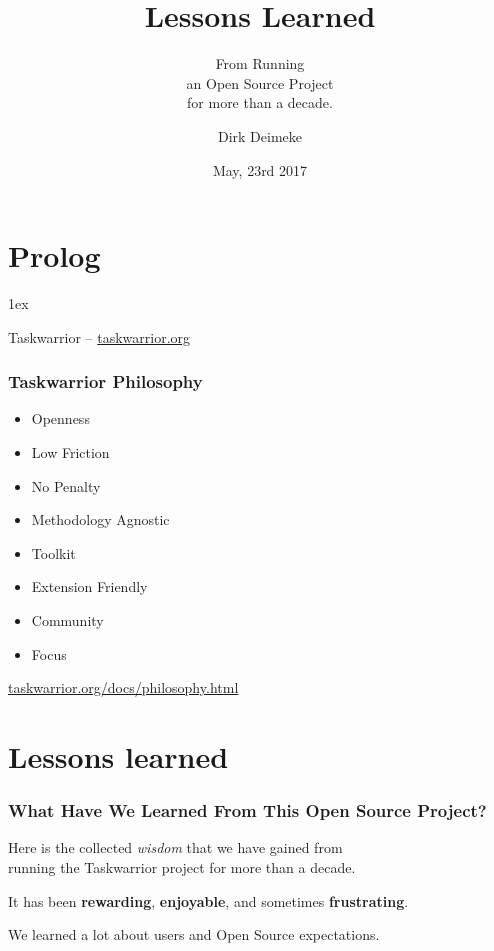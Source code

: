 \documentclass[t,aspectratio=169]{beamer}
\title{Lessons Learned}
\subtitle{From Running \\ an Open Source Project \\ for more than a decade.}
\date{May, 23rd 2017}
\author{Dirk Deimeke}
\institute{Taskwarrior Academy @ LinuxERFA}
\begin{document}
\begin{frame}
    \titlepage
\end{frame}

\section{Prolog}

\parskip1ex

\begin{frame}[standout]
    Taskwarrior -- \href{https://taskwarrior.org/}{taskwarrior.org}
\end{frame}

\begin{frame}[fragile]\frametitle{Taskwarrior Philosophy}
    \vfill
    \begin{itemize}
        \item Openness
        \item Low Friction
        \item No Penalty
        \item Methodology Agnostic
        \item Toolkit
        \item Extension Friendly
        \item Community
        \item Focus
    \end{itemize}

    \href{https://taskwarrior.org/docs/philosophy.html}{taskwarrior.org/docs/philosophy.html}
\end{frame}

\section{Lessons learned}

\begin{frame}[fragile]\frametitle{What Have We Learned From This Open Source Project?}
    \vfill
    Here is the collected \textit{wisdom} that we have gained from \\
    running the Taskwarrior project for more than a decade. \pause

    It has been \textbf{rewarding}, \textbf{enjoyable}, and sometimes \textbf{frustrating}. \pause

    We learned a lot about users and Open Source expectations.
\end{frame}
\end{document}
